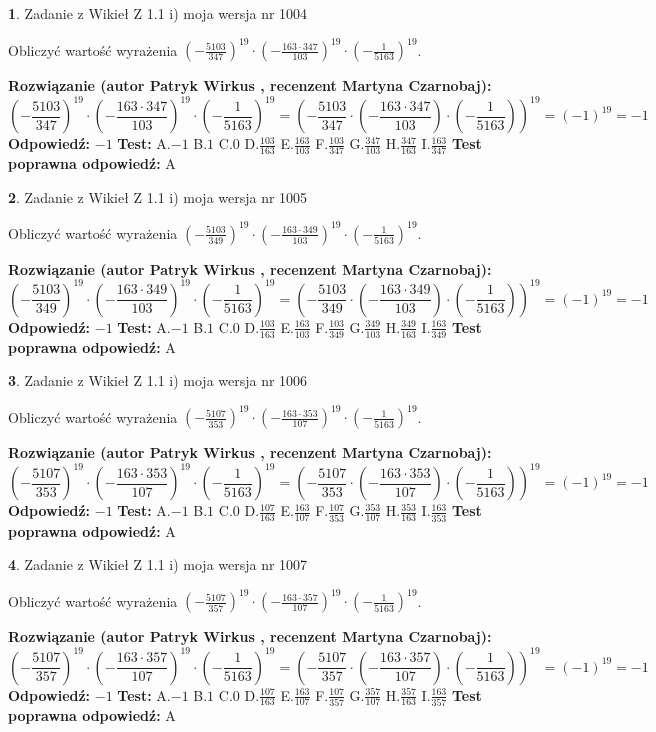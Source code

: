 \documentclass[12pt, a4paper]{article}
\theoremstyle{definition} %
\newtheorem{zad}{}
\newcommand{\zadStart}[1]{\begin{zad}#1\newline}
\newcommand{\zadStop}{\end{zad}}
\newcommand{\rozwStart}[2]{\noindent \textbf{Rozwiązanie (autor #1 , recenzent #2): }\newline}
\newcommand{\rozwStop}{\newline}
\newcommand{\odpStart}{\noindent \textbf{Odpowiedź:}\newline}
\newcommand{\odpStop}{\newline}
\newcommand{\testStart}{\noindent \textbf{Test:}\newline}
\newcommand{\testStop}{\newline}
\newcommand{\kluczStart}{\noindent \textbf{Test poprawna odpowiedź:}\newline}
\newcommand{\kluczStop}{\newline}
\begin{document}
\zadStart{Zadanie z Wikieł Z 1.1 i) moja wersja nr 1004}

Obliczyć wartość wyrażenia $(-\frac{5103}{347})^{19} \cdot (-\frac{163 \cdot 347}{103})^{19} \cdot (-\frac{1}{5163})^{19}$.
\zadStop
\rozwStart{Patryk Wirkus}{Martyna Czarnobaj}
$$(-\frac{5103}{347})^{19} \cdot (-\frac{163 \cdot 347}{103})^{19} \cdot (-\frac{1}{5163})^{19} = (-\frac{5103}{347} \cdot (-\frac{163 \cdot 347}{103}) \cdot (-\frac{1}{5163}))^{19} = (-1)^{19} = -1$$
\rozwStop
\odpStart
$-1$
\odpStop
\testStart
A.$-1$ B.$1$ C.$0$ D.$\frac{103}{163}$ E.$\frac{163}{103}$
F.$\frac{103}{347}$ G.$\frac{347}{103}$
H.$\frac{347}{163}$
I.$\frac{163}{347}$
\testStop
\kluczStart
A
\kluczStop



\zadStart{Zadanie z Wikieł Z 1.1 i) moja wersja nr 1005}

Obliczyć wartość wyrażenia $(-\frac{5103}{349})^{19} \cdot (-\frac{163 \cdot 349}{103})^{19} \cdot (-\frac{1}{5163})^{19}$.
\zadStop
\rozwStart{Patryk Wirkus}{Martyna Czarnobaj}
$$(-\frac{5103}{349})^{19} \cdot (-\frac{163 \cdot 349}{103})^{19} \cdot (-\frac{1}{5163})^{19} = (-\frac{5103}{349} \cdot (-\frac{163 \cdot 349}{103}) \cdot (-\frac{1}{5163}))^{19} = (-1)^{19} = -1$$
\rozwStop
\odpStart
$-1$
\odpStop
\testStart
A.$-1$ B.$1$ C.$0$ D.$\frac{103}{163}$ E.$\frac{163}{103}$
F.$\frac{103}{349}$ G.$\frac{349}{103}$
H.$\frac{349}{163}$
I.$\frac{163}{349}$
\testStop
\kluczStart
A
\kluczStop



\zadStart{Zadanie z Wikieł Z 1.1 i) moja wersja nr 1006}

Obliczyć wartość wyrażenia $(-\frac{5107}{353})^{19} \cdot (-\frac{163 \cdot 353}{107})^{19} \cdot (-\frac{1}{5163})^{19}$.
\zadStop
\rozwStart{Patryk Wirkus}{Martyna Czarnobaj}
$$(-\frac{5107}{353})^{19} \cdot (-\frac{163 \cdot 353}{107})^{19} \cdot (-\frac{1}{5163})^{19} = (-\frac{5107}{353} \cdot (-\frac{163 \cdot 353}{107}) \cdot (-\frac{1}{5163}))^{19} = (-1)^{19} = -1$$
\rozwStop
\odpStart
$-1$
\odpStop
\testStart
A.$-1$ B.$1$ C.$0$ D.$\frac{107}{163}$ E.$\frac{163}{107}$
F.$\frac{107}{353}$ G.$\frac{353}{107}$
H.$\frac{353}{163}$
I.$\frac{163}{353}$
\testStop
\kluczStart
A
\kluczStop



\zadStart{Zadanie z Wikieł Z 1.1 i) moja wersja nr 1007}

Obliczyć wartość wyrażenia $(-\frac{5107}{357})^{19} \cdot (-\frac{163 \cdot 357}{107})^{19} \cdot (-\frac{1}{5163})^{19}$.
\zadStop
\rozwStart{Patryk Wirkus}{Martyna Czarnobaj}
$$(-\frac{5107}{357})^{19} \cdot (-\frac{163 \cdot 357}{107})^{19} \cdot (-\frac{1}{5163})^{19} = (-\frac{5107}{357} \cdot (-\frac{163 \cdot 357}{107}) \cdot (-\frac{1}{5163}))^{19} = (-1)^{19} = -1$$
\rozwStop
\odpStart
$-1$
\odpStop
\testStart
A.$-1$ B.$1$ C.$0$ D.$\frac{107}{163}$ E.$\frac{163}{107}$
F.$\frac{107}{357}$ G.$\frac{357}{107}$
H.$\frac{357}{163}$
I.$\frac{163}{357}$
\testStop
\kluczStart
A
\kluczStop
\end{document}

